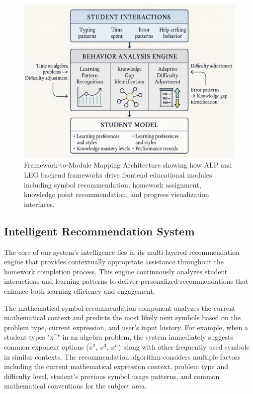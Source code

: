\documentclass[conference]{IEEEtran}
\begin{document}
\begin{IEEEkeywords}
\begin{figure}[htbp]
\centerline{\includegraphics[width=\columnwidth]{3.png}}
\caption{Framework-to-Module Mapping Architecture showing how ALP and LEG backend frameworks drive frontend educational modules including symbol recommendation, homework assignment, knowledge point recommendation, and progress visualization interfaces.}
\label{fig:framework_mapping}
\end{figure}

\subsection{Intelligent Recommendation System}

The core of our system's intelligence lies in its multi-layered recommendation engine that provides contextually appropriate assistance throughout the homework completion process. This engine continuously analyzes student interactions and learning patterns to deliver personalized recommendations that enhance both learning efficiency and engagement.

The mathematical symbol recommendation component analyzes the current mathematical context and predicts the most likely next symbols based on the problem type, current expression, and user's input history. For example, when a student types "x\^{}" in an algebra problem, the system immediately suggests common exponent options ($x^2$, $x^3$, $x^n$) along with other frequently used symbols in similar contexts. The recommendation algorithm considers multiple factors including the current mathematical expression context, problem type and difficulty level, student's previous symbol usage patterns, and common mathematical conventions for the subject area.


\end{IEEEkeywords}
\end{document}
